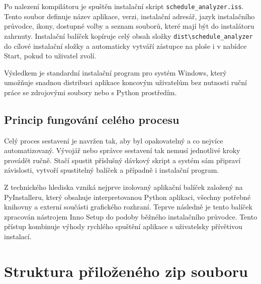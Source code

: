 \documentclass[czech, kiv, ba, he, iso690alph, pdf]{fasthesis}
\begin{document}
			Po nalezení kompilátoru je spuštěn instalační skript \texttt{schedule\_analyzer.iss}. Tento soubor definuje název aplikace, verzi, instalační adresář, jazyk instalačního průvodce, ikony, dostupné volby a seznam souborů, které mají být do instalátoru zahrnuty. Instalační balíček kopíruje celý obsah složky \texttt{dist\textbackslash schedule\_analyzer} do cílové instalační složky a automaticky vytváří zástupce na ploše i v nabídce Start, pokud to uživatel zvolí.
	
			Výsledkem je standardní instalační program pro systém Windows, který umožňuje snadnou distribuci aplikace koncovým uživatelům bez nutnosti ruční práce se zdrojovými soubory nebo s Python prostředím.
	
		\section{Princip fungování celého procesu}
	
			Celý proces sestavení je navržen tak, aby byl opakovatelný a co nejvíce automatizovaný. Vývojář nebo správce sestavení tak nemusí jednotlivé kroky provádět ručně. Stačí spustit příslušný dávkový skript a systém sám připraví závislosti, vytvoří spustitelný balíček a případně i instalační program.
	
			Z technického hlediska vzniká nejprve izolovaný aplikační balíček založený na PyInstalleru, který obsahuje interpretovanou Python aplikaci, všechny potřebné knihovny a externí součásti grafického rozhraní. Teprve následně je tento balíček zpracován nástrojem Inno Setup do podoby běžného instalačního průvodce. Tento přístup kombinuje výhody rychlého spuštění aplikace s uživatelsky přívětivou instalací.
	
	\chapter{Struktura přiloženého zip souboru}
	
	\backmatter
	\printbibliography
	\setbackpageqrcode
	\backpage
	
\end{document}
